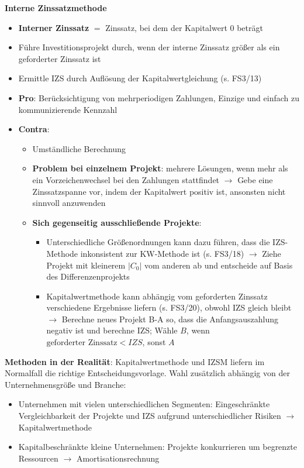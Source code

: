\bigskip
\textbf{Interne Zinssatzmethode}
\begin{itemize}
	\item \textbf{Interner Zinssatz} $=$ Zinssatz, bei dem der Kapitalwert $0$ beträgt
	\item Führe Investitionsprojekt durch, wenn der interne Zinssatz größer als ein geforderter Zinssatz ist
	\item Ermittle IZS durch Auflösung der Kapitalwertgleichung (s. FS3/13)
	\item \textbf{Pro}: Berücksichtigung von mehrperiodigen Zahlungen, Einzige und einfach zu kommunizierende Kennzahl
	\item \textbf{Contra}: 
	\begin{itemize}
		\item Umständliche Berechnung
		\item \textbf{Problem bei einzelnem Projekt}: mehrere Lösungen, wenn mehr als ein Vorzeichenwechsel bei den Zahlungen stattfindet 
		$\rightarrow$ Gebe eine Zinssatzspanne vor, indem der Kapitalwert positiv ist, ansonsten nicht sinnvoll anzuwenden
		\item \textbf{Sich gegenseitig ausschließende Projekte}: 
		\begin{itemize}
			\item Unterschiedliche Größenordnungen kann dazu führen, dass die IZS-Methode inkonsistent zur KW-Methode ist (s. FS3/18)
			$\rightarrow$ Ziehe Projekt mit kleinerem $|C_0|$ vom anderen ab und entscheide auf Basis des Differenzenprojekts
			\item Kapitalwertmethode kann abhängig vom geforderten Zinssatz verschiedene Ergebnisse liefern (s. FS3/20), obwohl IZS gleich bleibt
			$\rightarrow$ Berechne neues Projekt B-A so, dass die Anfangsauszahlung negativ ist und berechne IZS; Wähle $B$, wenn $\text{geforderter Zinssatz} < IZS$, sonst $A$
		\end{itemize}
	\end{itemize}
\end{itemize}
\bigskip
\textbf{Methoden in der Realität}:
Kapitalwertmethode und IZSM liefern im Normalfall die richtige Entscheidungsvorlage. Wahl zusätzlich abhängig von der Unternehmensgröße und Branche:
\begin{itemize}
	\item Unternehmen mit vielen unterschiedlichen Segmenten: Eingeschränkte Vergleichbarkeit der Projekte und IZS aufgrund unterschiedlicher Risiken $\rightarrow$ Kapitalwertmethode
	\item Kapitalbeschränkte kleine Unternehmen: Projekte konkurrieren um begrenzte Ressourcen $\rightarrow$ Amortisationsrechnung
\end{itemize}
